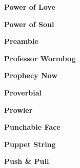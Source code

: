 \vspace{10pt} 
\begin{center}\textbf{Power of Love}\end{center}
\newline
\vspace{10pt} 
\begin{center}\textbf{Power of Soul}\end{center}
\newline
\vspace{10pt} 
\begin{center}\textbf{Preamble}\end{center}
\newline
\vspace{10pt} 
\begin{center}\textbf{Professor Wormbog}\end{center}
\newline
\vspace{10pt} 
\begin{center}\textbf{Prophecy Now}\end{center}
\newline
\vspace{10pt} 
\begin{center}\textbf{Proverbial}\end{center}
\newline
\vspace{10pt} 
\begin{center}\textbf{Prowler}\end{center}
\newline
\vspace{10pt} 
\begin{center}\textbf{Punchable Face}\end{center}
\newline
\vspace{10pt} 
\begin{center}\textbf{Puppet String}\end{center}
\newline
\vspace{10pt} 
\begin{center}\textbf{Push \& Pull}\end{center}
